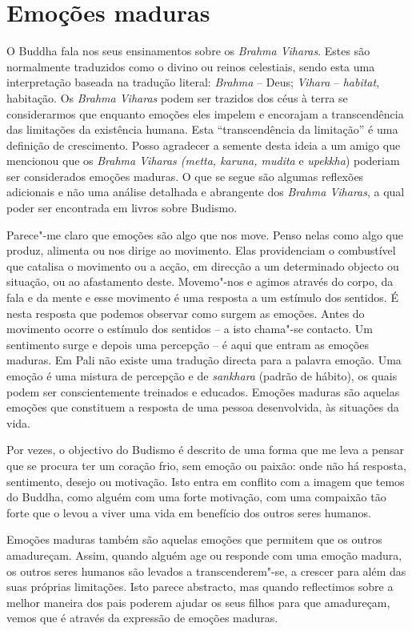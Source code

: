 \chapter{Emoções maduras}

O Buddha fala nos seus ensinamentos sobre os \emph{Brahma Viharas}.
Estes são normalmente traduzidos como o divino ou reinos celestiais,
sendo esta uma interpretação baseada na tradução literal: \emph{Brahma}
-- Deus; \emph{Vihara} -- \emph{habitat}, habitação. Os \emph{Brahma
Viharas} podem ser trazidos dos céus à terra se considerarmos que
enquanto emoções eles impelem e encorajam a transcendência das
limitações da existência humana. Esta ``transcendência da limitação'' é
uma definição de crescimento. Posso agradecer a semente desta ideia a um
amigo que mencionou que os \emph{Brahma Viharas (metta, karuna, mudita}
e \emph{upekkha}) poderiam ser considerados emoções maduras. O que se
segue são algumas reflexões adicionais e não uma análise detalhada e
abrangente dos \emph{Brahma Viharas}, a qual poder ser encontrada em
livros sobre Budismo.

Parece"-me claro que emoções são algo que nos move. Penso nelas como algo
que produz, alimenta ou nos dirige ao movimento. Elas providenciam o
combustível que catalisa o movimento ou a acção, em direcção a um
determinado objecto ou situação, ou ao afastamento deste. Movemo"-nos e
agimos através do corpo, da fala e da mente e esse movimento é uma
resposta a um estímulo dos sentidos. É nesta resposta que podemos
observar como surgem as emoções. Antes do movimento ocorre o estímulo
dos sentidos -- a isto chama"-se contacto. Um sentimento surge e depois
uma percepção -- é aqui que entram as emoções maduras. Em Pali não
existe uma tradução directa para a palavra emoção. Uma emoção é uma
mistura de percepção e de \emph{sankhara} (padrão de hábito), os quais
podem ser conscientemente treinados e educados. Emoções maduras são
aquelas emoções que constituem a resposta de uma pessoa desenvolvida, às
situações da vida.

Por vezes, o objectivo do Budismo é descrito de uma forma que me leva a
pensar que se procura ter um coração frio, sem emoção ou paixão: onde
não há resposta, sentimento, desejo ou motivação. Isto entra em conflito
com a imagem que temos do Buddha, como alguém com uma forte motivação,
com uma compaixão tão forte que o levou a viver uma vida em benefício
dos outros seres humanos.

Emoções maduras também são aquelas emoções que permitem que os outros
amadureçam. Assim, quando alguém age ou responde com uma emoção madura,
os outros seres humanos são levados a transcenderem"-se, a crescer para
além das suas próprias limitações. Isto parece abstracto, mas quando
reflectimos sobre a melhor maneira dos pais poderem ajudar os seus
filhos para que amadureçam, vemos que é através da expressão de emoções
maduras.

